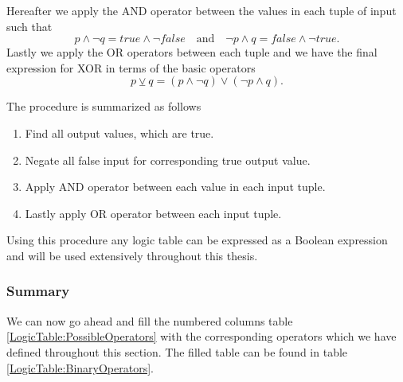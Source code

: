                 Hereafter we apply the AND operator between the values in each tuple of input such that
                \begin{equation}
                    p \wedge \neg q = true \wedge \neg false \quad \text{and} \quad \neg p \wedge q = false \wedge \neg true.
                \end{equation}
                Lastly we apply the OR operators between each tuple and we have the final expression for XOR in terms of the basic operators
                \begin{equation}
                    p \veebar q = (p \wedge \neg q) \vee (\neg p \wedge q).
                \end{equation}
                
                The procedure is summarized as follows
                \begin{enumerate}
                    \item Find all output values, which are true.
                    \item Negate all false input for corresponding true output value.
                    \item Apply AND operator between each value in each input tuple.
                    \item Lastly apply OR operator between each input tuple.
                \end{enumerate}
                Using this procedure any logic table can be expressed as a Boolean expression and will be used extensively throughout this thesis.
                
                
            \subsubsection{Summary}
            
                We can now go ahead and fill the numbered columns table \ref{LogicTable:PossibleOperators} with the corresponding operators which we have defined throughout this section. The filled table can be found in table \ref{LogicTable:BinaryOperators}. 
                
